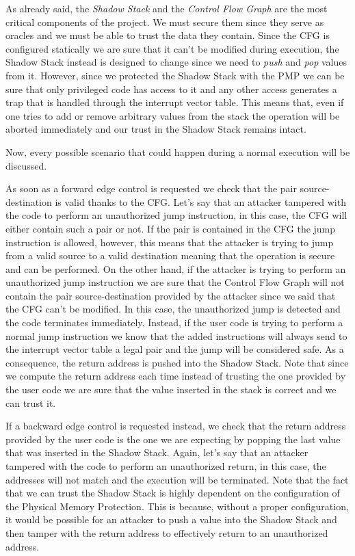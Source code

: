 As already said, the \textit{Shadow Stack} and the \textit{Control Flow Graph} are
the most critical components of the project. We must secure them since they
serve as oracles and we must be able to trust the data they contain. Since the CFG
is configured statically we are sure that it can't be modified during execution,
the Shadow Stack instead is designed to change since we need to \textit{push} and
\textit{pop} values from it. However, since we protected the Shadow Stack with
the PMP we can be sure that only privileged code has access to it and any other
access generates a trap that is handled through the interrupt vector table. This
means that, even if one tries to add or remove arbitrary values from the stack
the operation will be aborted immediately and our trust in the Shadow Stack
remains intact.

Now, every possible scenario that could happen during a normal execution will be
discussed.

As soon as a forward edge control is requested we check that the pair source-destination
is valid thanks to the CFG. Let's say that an attacker tampered with the code to
perform an unauthorized jump instruction, in this case, the CFG will either
contain such a pair or not. If the pair is contained in the CFG the jump instruction
is allowed, however, this means that the attacker is trying to jump from a valid
source to a valid destination meaning that the operation is secure and can be performed.
On the other hand, if the attacker is trying to perform an unauthorized jump instruction
we are sure that the Control Flow Graph will not contain the pair source-destination
provided by the attacker since we said that the CFG can't be modified. In this
case, the unauthorized jump is detected and the code terminates immediately.
Instead, if the user code is trying to perform a normal jump instruction we know
that the added instructions will always send to the interrupt vector table a legal
pair and the jump will be considered safe. As a consequence, the return address is
pushed into the Shadow Stack. Note that since we compute the return address each
time instead of trusting the one provided by the user code we are sure that the
value inserted in the stack is correct and we can trust it.

If a backward edge control is requested instead, we check that the return address
provided by the user code is the one we are expecting by popping the last value that
was inserted in the Shadow Stack. Again, let's say that an attacker tampered with
the code to perform an unauthorized return, in this case, the addresses will not
match and the execution will be terminated. Note that the fact that we can trust
the Shadow Stack is highly dependent on the configuration of the Physical Memory
Protection. This is because, without a proper configuration, it would be possible
for an attacker to push a value into the Shadow Stack and then tamper with the return
address to effectively return to an unauthorized address.

